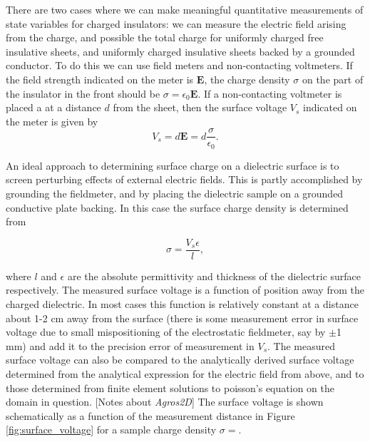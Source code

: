 \documentclass[a4paper, 12pt]{article}
\begin{document}
There are two cases where we can make meaningful quantitative measurements of state variables for charged insulators: we can measure the electric field arising from the charge, and possible the total charge for uniformly charged free insulative sheets, and uniformly charged insulative sheets backed by a grounded conductor. To do this we can use field meters and non-contacting voltmeters. If the field strength indicated on the meter is $\mathbf{E}$, the charge density $\sigma$ on the part of the insulator in the front should be $\sigma = \epsilon_0 \mathbf{E}$. If a non-contacting voltmeter is placed a at a distance $d$ from the sheet, then the surface voltage $V_s$ indicated on the meter is given by 
\[V_s = d \mathbf{E} = d \frac{\sigma}{\epsilon_0}. \]


An ideal approach to determining surface charge on a dielectric surface is to screen perturbing effects of external electric fields. This is partly accomplished by grounding the fieldmeter, and by placing the dielectric sample on a grounded conductive plate backing. In this case the surface charge density is determined from

\[ \sigma = \frac{V_s \epsilon}{l}, \]

where $l$ and $\epsilon$ are the absolute permittivity and thickness of the dielectric surface respectively. The measured surface voltage is a function of position away from the charged dielectric. In most cases this function is relatively constant at a distance about 1-2 cm away from the surface (there is some measurement error in surface voltage due to small mispositioning of the electrostatic fieldmeter, say by $\pm$1 mm) and add it to the precision error of measurement in $V_s$. The measured surface voltage can also be compared to the analytically derived surface voltage determined from the analytical expression for the electric field from above, and to those determined from finite element solutions to poisson's equation on the domain in question. [Notes about \emph{Agros2D}] The surface voltage is shown schematically as a function of the measurement distance in Figure \ref{fig:surface_voltage} for a sample charge density $\sigma = $.

\end{document}
